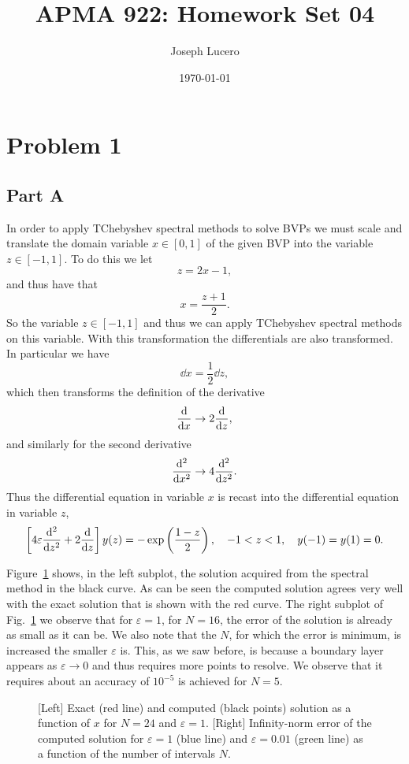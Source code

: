 \documentclass[12pt]{article}
\title{APMA 922: Homework Set 04}
\author{Joseph Lucero}
\date{\today}
\begin{document}
\maketitle

\section*{Problem 1}

\subsection*{Part A}

In order to apply TChebyshev spectral methods to solve BVPs we must scale and translate the domain variable $x \in [0,1]$ of the given BVP into the variable $z\in [-1,1]$. To do this we let $$z = 2x-1,$$ and thus have that $$x = \dfrac{z+1}{2}.$$ So the variable $z\in [-1,1]$ and thus we can apply TChebyshev spectral methods on this variable. With this transformation the differentials are also transformed. In particular we have $$\dd{x} = \dfrac{1}{2}\dd{z},$$ which then transforms the definition of the derivative $$ \dv{x}\to 2\dv{z},$$ and similarly for the second derivative $$\dv[2]{x}\to 4\dv[2]{z}.$$ Thus the differential equation in variable $x$ is recast into the differential equation in variable $z$, 
\begin{align}
	\left[4\varepsilon\dv[2]{z} + 2\dv{z}\right]y(z) = -\exp\left(\dfrac{1-z}{2}\right),\quad -1 < z < 1,\quad y(-1) = y(1) = 0.
\end{align}

Figure~\ref{fig:q1a_figure} shows, in the left subplot, the solution acquired from the spectral method in the black curve. As can be seen the computed solution agrees very well with the exact solution that is shown with the red curve. The right subplot of Fig.~\ref{fig:q1a_figure} we observe that for $\varepsilon=1$, for $N=16$, the error of the solution is already as small as it can be. We also note that the $N$, for which the error is minimum, is increased the smaller $\varepsilon$ is. This, as we saw before, is because a boundary layer appears as $\varepsilon\to 0$ and thus requires more points to resolve. We observe that it requires about an accuracy of $10^{-5}$ is achieved for $N=5$.

\begin{figure}[!h]
	\centering
	\caption{[Left] Exact (red line) and computed (black points) solution as a function of $x$ for $N=24$ and $\varepsilon=1$. [Right] Infinity-norm error of the computed solution for $\varepsilon=1$ (blue line) and $\varepsilon=0.01$ (green line) as a function of the number of intervals $N$.}
	\label{fig:q1a_figure}
\end{figure}
\end{document}
